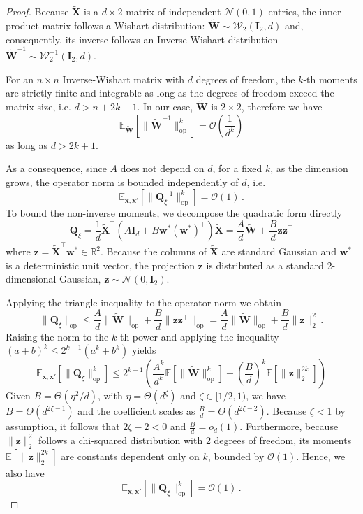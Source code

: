 \begin{proof}
    Because $\tilde{\bm X}$ is a $d \times 2$ matrix of independent $\mathcal{N}(0, 1)$ entries, the inner product matrix follows a Wishart distribution: $\tilde{\bm W} \sim \mathcal{W}_2(\bm I_2, d)$ and, consequently, its inverse follows an Inverse-Wishart distribution $\tilde{\bm W}^{-1} \sim \mathcal{W}^{-1}_2(\bm I_2, d)$.

    For an $n \times n$ Inverse-Wishart matrix with $d$ degrees of freedom, the $k$-th moments are strictly finite and integrable as long as the degrees of freedom exceed the matrix size, i.e. $d > n + 2k - 1$. In our case, $\tilde{\bm W}$ is $2 \times 2$, therefore we have
    \[
       \mathbb{E}_{\tilde{\bm W}} \left[ \|\tilde{\bm W}^{-1}\|_{\text{op}}^k \right] = \mathcal O\left(\frac{1}{d^k}\right)
    \]
    as long as $d > 2k + 1.$

    As a consequence, since $A$ does not depend on $d$, for a fixed $k$, as the dimension grows, the operator norm is bounded independently of $d$, i.e.
    \[
        \mathbb{E}_{\bm x, \bm x'} \left[ \|\bm Q_\xi^{-1}\|_{\text{op}}^k \right] = \mathcal O(1)\, .
    \]
    To bound the non-inverse moments, we decompose the quadratic form directly
    \[
        \bm{Q}_\xi = \frac{1}{d} \tilde{\bm{X}}^\top (A\bm{I}_d + B\bm{w^*}(\bm{w^*})^\top) \tilde{\bm{X}} = \frac{A}{d} \tilde{\bm{W}} + \frac{B}{d} \bm{z}\bm{z}^\top
    \]
    where $\bm{z} = \tilde{\bm{X}}^\top \bm{w^*} \in \mathbb{R}^2$. Because the columns of $\tilde{\bm{X}}$ are standard Gaussian and $\bm{w^*}$ is a deterministic unit vector, the projection $\bm{z}$ is distributed as a standard 2-dimensional Gaussian, $\bm{z} \sim \mathcal{N}(0, \bm{I}_2)$.

    Applying the triangle inequality to the operator norm we obtain
    \[
        \|\bm{Q}_\xi\|_{\text{op}} \le \frac{A}{d} \|\widetilde{\bm{W}}\|_{\text{op}} + \frac{B}{d} \|\bm{z}\bm{z}^\top\|_{\text{op}} = \frac{A}{d} \|\widetilde{\bm{W}}\|_{\text{op}} + \frac{B}{d} \|\bm{z}\|_2^2\, .
    \]
    Raising the norm to the $k$-th power and applying the inequality $(a+b)^k \le 2^{k-1}(a^k + b^k)$ yields
    \[
        \mathbb{E}_{\bm x, \bm x'}[\|\bm{Q}_\xi\|_{\text{op}}^k] \le 2^{k-1} \left( \frac{A^k}{d^k} \mathbb{E}[\|\widetilde{\bm{W}}\|_{\text{op}}^k] + \left(\frac{B}{d}\right)^k \mathbb{E}[\|\bm{z}\|_2^{2k}] \right)
    \]
    Given $B = \Theta(\eta^2/d)$, with $\eta = \Theta(d^\zeta)$ and $\zeta \in [1/2, 1)$, we have $B = \Theta(d^{2\zeta - 1})$ and the coefficient scales as $\frac{B}{d} = \Theta(d^{2\zeta-2})$. Because $\zeta < 1$ by assumption, it follows that $2\zeta - 2 < 0$ and $\frac{B}{d} = o_d(1)$. Furthermore, because $\|\bm{z}\|_2^2$ follows a chi-squared distribution with 2 degrees of freedom, its moments $\mathbb{E}[\|\bm{z}\|_2^{2k}]$ are constants dependent only on $k$, bounded by $\mathcal{O}(1)$. Hence, we also have
    \[
        \mathbb{E}_{\bm x, \bm x'} \left[ \|\bm Q_\xi\|_{\text{op}}^k \right] = \mathcal O(1)\, .
    \]
    

\end{proof}
